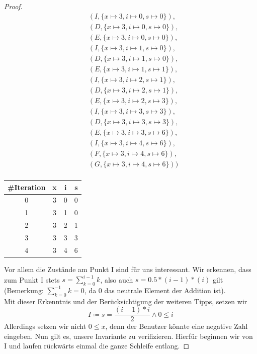 \documentclass[hidelinks]{article}
\theoremstyle{plain}
\theoremstyle{definition}
\theoremstyle{rem}
\begin{document}
\begin{sloppypar}
\begin{proof}
{\begin{minipage}[ht]{0.48\linewidth}
\begin{align*}
&(I,\{x\mapsto 3,i\mapsto 0, s\mapsto 0\}),\\
&(D,\{x\mapsto 3,i\mapsto 0, s\mapsto 0\}),\\
&(E,\{x\mapsto 3,i\mapsto 0, s\mapsto 0\}),\\
&(I,\{x\mapsto 3,i\mapsto 1, s\mapsto 0\}),\\
&(D,\{x\mapsto 3,i\mapsto 1, s\mapsto 0\}),\\
&(E,\{x\mapsto 3,i\mapsto 1, s\mapsto 1\}),\\
&(I,\{x\mapsto 3,i\mapsto 2, s\mapsto 1\}),\\
&(D,\{x\mapsto 3,i\mapsto 2, s\mapsto 1\}),\\
&(E,\{x\mapsto 3,i\mapsto 2, s\mapsto 3\}),\\
&(I,\{x\mapsto 3,i\mapsto 3, s\mapsto 3\}),\\
&(D,\{x\mapsto 3,i\mapsto 3, s\mapsto 3\}),\\
&(E,\{x\mapsto 3,i\mapsto 3, s\mapsto 6\}),\\
&(I,\{x\mapsto 3,i\mapsto 4, s\mapsto 6\}),\\
&(F,\{x\mapsto 3,i\mapsto 4, s\mapsto 6\}),\\
&(G,\{x\mapsto 3,i\mapsto 4, s\mapsto 6\}))\\
\end{align*}
\end{minipage}}
\hfill
\begin{minipage}[ht]{0.48\linewidth}
\centering
\begin{tabular}{|c|c|c|c|}
  \hline
  \#Iteration & x & i & s\\\hline
  0 & 3 & 0 & 0\\\hline
  1 & 3 & 1 & 0\\\hline
  2 & 3 & 2 & 1\\\hline
  3 & 3 & 3 & 3\\\hline
  4 & 3 & 4 & 6\\\hline
\end{tabular}
\end{minipage}
Vor allem die Zustände am Punkt I sind für uns interessant. Wir erkennen, dass zum Punkt I stets $s=\sum_{k=0}^{i-1}k$, also auch $s=0.5*(i-1)*(i)$ gilt (Bemerkung: $\sum_{k=0}^{-1}k=0$, da 0 das neutrale Element der Addition ist).\\
Mit dieser Erkenntnis und der Berücksichtigung der weiteren Tipps, setzen wir
\begin{equation*}
I\coloneqq s=\frac{(i-1)*i}{2}\wedge 0\le i
\end{equation*}
Allerdings setzen wir nicht $0\le x$, denn der Benutzer könnte eine negative Zahl eingeben. Nun gilt es, unsere Invariante zu verifizieren. Hierfür beginnen wir von I und laufen rückwärts einmal die ganze Schleife entlang.

\end{proof}
\end{sloppypar}
\end{document}
